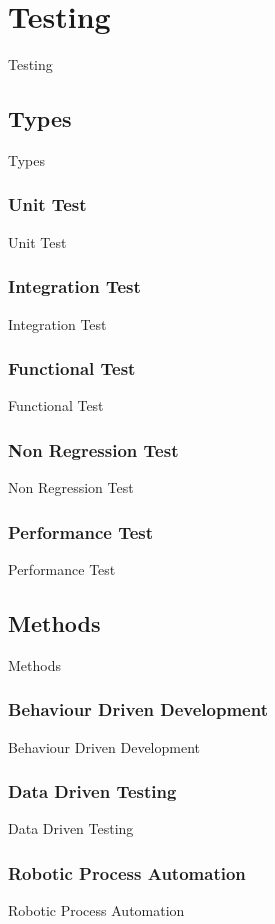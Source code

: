 \section{Testing}\label{sec:testing}
Testing

\subsection{Types}\label{subsec:types}
Types

\subsubsection{Unit Test}
Unit Test

\subsubsection{Integration Test}
Integration Test

\subsubsection{Functional Test}
Functional Test

\subsubsection{Non Regression Test}
Non Regression Test

\subsubsection{Performance Test}
Performance Test

\subsection{Methods}\label{subsec:methods}
Methods

\subsubsection{Behaviour Driven Development}
Behaviour Driven Development

\subsubsection{Data Driven Testing}
Data Driven Testing

\subsubsection{Robotic Process Automation}
Robotic Process Automation

